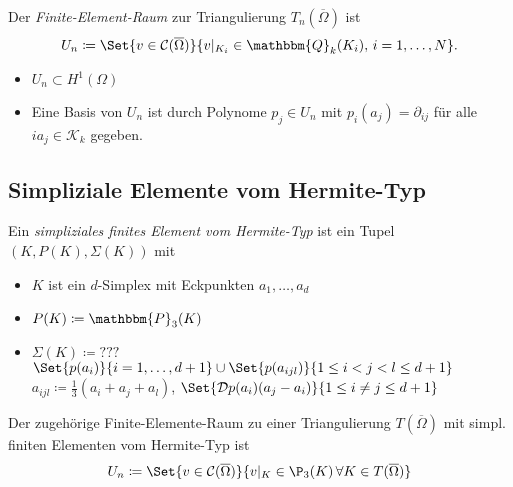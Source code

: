 \documentclass{cheat-sheet}
\newcommand{\Cont}{\mathcal{C}} %
\newcommand{\clos}[1]{\overline{#1}} %
\newcommand{\cOmega}{\clos{\Omega}} %
\newcommand{\DO}{\mathcal{D}} %
\newcommand{\Poly}{\mathbbm{P}} %
\newcommand{\Qoly}{\mathbbm{Q}} %
\begin{document}
\begin{defn}
  Der \textit{Finite-Element-Raum} zur Triangulierung $T_n(\cOmega)$ ist
  \[
    U_n \coloneqq \Set{v \in \Cont(\cOmega)}{v|_{K_i} \in \Qoly_k(K_i), \, i = 1, \ldots, N}.
  \]
\end{defn}

\begin{lem}
  \begin{itemize}
    \item $U_n \subset H^1(\Omega)$
    \item Eine Basis von $U_n$ ist durch Polynome $p_j \in U_n$ mit $p_i(a_j) = \partial_{ij}$ für alle $ia_j \in \mathcal{K}_k$ gegeben.
  \end{itemize}
\end{lem}


\subsection{Simpliziale Elemente vom Hermite-Typ}

\begin{defn}
  Ein \emph{simpliziales finites Element vom Hermite-Typ} ist ein Tupel $(K, P(K), \Sigma(K))$ mit
  \begin{itemize}
    \item $K$ ist ein $d$-Simplex mit Eckpunkten $a_1, \ldots, a_d$
    \item $P(K) \coloneqq \Poly_3(K)$
    \item $\Sigma(K) \coloneqq ???$ $\Set{p(a_i)}{i = 1, \ldots, d+1} \cup \Set{p(a_{ijl})}{1 \leq i < j < l \leq d+1}$ $a_{ijl} \coloneqq \tfrac{1}{3} (a_i + a_j + a_l)$, $\Set{\DO p(a_i) (a_j  - a_i)}{1 \leq i \neq j \leq d+1}$
  \end{itemize}
  Der zugehörige Finite-Elemente-Raum zu einer Triangulierung $T(\cOmega)$ mit simpl. finiten Elementen vom Hermite-Typ ist
  \[
    U_n \coloneqq \Set{v \in \Cont(\cOmega)}{v|_K \in \P_3(K) \, \forall K \in T(\cOmega)}
  \]
\end{defn}

\end{document}
